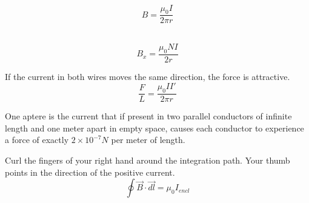 \documentclass[nobib,notoc]{tufte-handout}
\begin{document}
\begin{defi}
	\,
	\begin{equation*}
		B=\frac{\mu_0I}{2\pi r}
	\end{equation*}
\end{defi}
\begin{defi}
	\,
	\begin{equation*}
		B_x=\frac{\mu_0NI}{2r}
	\end{equation*}
\end{defi}
\begin{defi}
	If the current in both wires moves the same direction, the force is attractive.
	\begin{equation*}
		\frac{F}{L}=\frac{\mu_0II'}{2\pi r}
	\end{equation*}
\end{defi}
\begin{defi}[Ampere]
	One aptere is the current that if present in two parallel conductors of infinite length and one meter apart in empty space, causes each conductor to experience a force of exactly \(2\times 10^{-7}N\) per meter of length.
\end{defi}
\begin{defi}
	Curl the fingers of your right hand around the integration path. Your thumb points in the direction of the positive current.
	\begin{equation*}
		\oint\vec{B}\cdot\vec{dl}=\mu_0 I_{encl}
	\end{equation*}
\end{defi}
\end{document}
